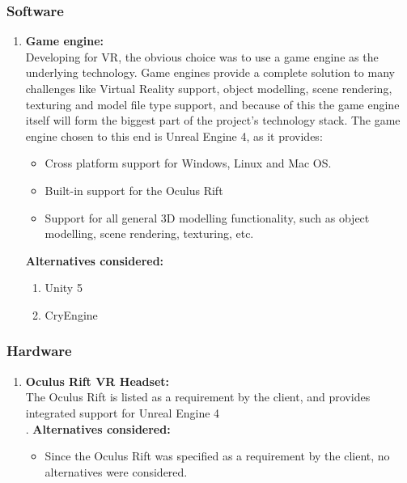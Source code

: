 \documentclass[a4paper,12pt]{article}
\begin{document}
\subsubsection{Software}
\begin{enumerate}
	\item \textbf{Game engine:}\\
		Developing for VR, the obvious choice was to use a game engine as the underlying technology. Game engines provide a complete solution to many challenges like Virtual Reality support, object modelling, scene rendering, texturing and model file type support, and because of this the game engine itself will form the biggest part of the project's technology stack. The game engine chosen to this end is Unreal Engine 4, as it provides:
		\begin{itemize}
			\item Cross platform support for Windows, Linux and Mac OS.
			\item Built-in support for the Oculus Rift
			\item Support for all general 3D modelling functionality, such as object modelling, scene rendering, texturing, etc.
		\end{itemize}
		\textbf{Alternatives considered:}
		\begin{enumerate}
			\item Unity 5 %
			\item CryEngine %
		\end{enumerate}
\end{enumerate}
\subsubsection{Hardware}
\begin{enumerate}
	\item \textbf{Oculus Rift VR Headset:}\\
		The Oculus Rift is listed as a requirement by the client, and provides integrated support for Unreal Engine 4\\.
		\textbf{Alternatives considered:}
		\begin{itemize}
			\item Since the Oculus Rift was specified as a requirement by the client, no alternatives were considered.
		\end{itemize}
\end{enumerate}
\newpage
%
%
\end{document}
